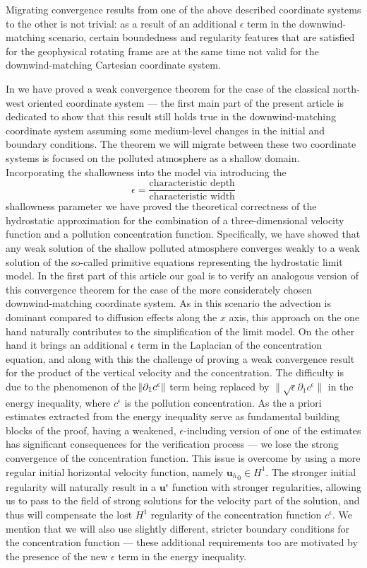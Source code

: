 \documentclass[11pt]{article}
\begin{document}
Migrating convergence results from one of the above described coordinate systems to the other is not trivial: as a result of an additional $\epsilon$ term in the downwind-matching scenario, certain boundedness and regularity features that are satisfied for the geophysical rotating frame are at the same time not valid for the downwind-matching Cartesian coordinate system.

In \cite{pollatmws2019} we have proved a weak convergence theorem for the case of the classical north-west oriented coordinate system --- the first main part of the present article is dedicated to show that this result still holds true in the downwind-matching coordinate system assuming some medium-level changes in the initial and boundary conditions. The theorem we will migrate between these two coordinate systems is focused on the polluted atmosphere as a shallow domain. Incorporating the shallowness into the model via introducing the $$\epsilon = \frac{\text{characteristic depth}}{\text{characteristic width}}$$ shallowness parameter we have proved the theoretical correctness of the hydrostatic approximation for the combination of a three-dimensional velocity function and a pollution concentration function. Specifically, we have showed that any weak solution of the shallow polluted atmosphere converges weakly to a weak solution of the so-called primitive equations representing the hydrostatic limit model. In the first part of this article our goal is to verify an analogous version of this convergence theorem for the case of the more considerately chosen downwind-matching coordinate system. As in this scenario the advection is dominant compared to diffusion effects along the $x$ axis, this approach on the one hand naturally contributes to the simplification of the limit model. On the other hand it brings an additional $\epsilon$ term in the Laplacian of the concentration equation, and along with this the challenge of proving a weak convergence result for the product of the vertical velocity and the concentration. The difficulty is due to the phenomenon of the $\norm{\partial_1 c^\epsilon}$ term being replaced by $\| \sqrt{\epsilon} \partial_1 c^\epsilon \|$ in the energy inequality, where $c^\epsilon$ is the pollution concentration. As the a priori estimates extracted from the energy inequality serve as fundamental building blocks of the proof, having a weakened, $\epsilon$-including version of one of the estimates has significant consequences for the verification process --- we lose the strong convergence of the concentration function. This issue is overcome by using a more regular initial horizontal velocity function, namely ${\mathbf{u}_h}_0 \in H^1.$ The stronger initial regularity will naturally result in a $\mathbf{u}^\epsilon$ function with stronger regularities, allowing us to pass to the field of strong solutions for the velocity part of the solution, and thus will compensate the lost $H^1$ regularity of the concentration function $c^\epsilon.$ We mention that we will also use slightly different, stricter boundary conditions for the concentration function --- these additional requirements too are motivated by the presence of the new $\epsilon$ term in the energy inequality.
\end{document}
